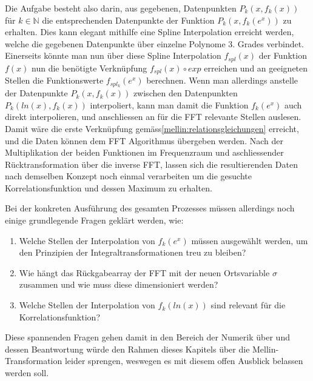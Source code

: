 Die Aufgabe besteht also darin, aus gegebenen, Datenpunkten $P_k(x,f_k(x))$ für 
$k \in \mathbb{N}$ die entsprechenden Datenpunkte der Funktion $P_k(x,f_k(e^x))$ zu erhalten.
Dies kann elegant mithilfe eine Spline Interpolation erreicht werden, welche die gegebenen 
Datenpunkte über einzelne Polynome 3. Grades verbindet.
Einerseits könnte man nun über diese Spline Interpolation $f_{spl}(x)$ der Funktion $f(x)$ nun die 
benötigte Verknüpfung $f_{spl}(x) \circ exp$ erreichen und an geeigneten Stellen die Funktionswerte 
$f_{spl_k}(e^x)$ berechnen.
Wenn man allerdings anstelle der Datenpunkte $P_k(x,f_k(x))$ zwischen den Datenpunkten 
$P_k(ln(x),f_k(x))$ interpoliert, kann man damit die Funktion $f_k(e^x)$ auch direkt interpolieren, 
und anschliessen an für die FFT relevante Stellen auslesen.
Damit wäre die erste Verknüpfung gemäss\ref{mellin:relationsgleichungen} erreicht, und die Daten 
können dem FFT Algorithmus übergeben werden. 
Nach der Multiplikation der beiden Funktionen im Frequenzraum und aschliessender Rücktransformation 
über die inverse FFT, lassen sich die resultierenden Daten nach demselben Konzept noch einmal 
verarbeiten um die gesuchte Korrelationsfunktion und dessen Maximum zu erhalten.

Bei der konkreten Ausführung des gesamten Prozesses müssen allerdings noch einige grundlegende Fragen 
geklärt werden, wie:
\begin{enumerate}
    \item Welche Stellen der Interpolation von $f_k(e^x)$ müssen ausgewählt werden, um den Prinzipien der Integraltransformationen treu zu bleiben?
    \item Wie hängt das Rückgabearray der FFT mit der neuen Ortsvariable $\sigma$ zusammen und wie muss diese dimensioniert werden?
    \item Welche Stellen der Interpolation von $f_k(ln(x))$ sind relevant für die Korrelationsfunktion?
\end{enumerate}

Diese spannenden Fragen gehen damit in den Bereich der Numerik über und dessen Beantwortung würde den 
Rahmen dieses Kapitels über die Mellin-Transformation leider sprengen, weswegen es mit diesem offen
Ausblick belassen werden soll.











